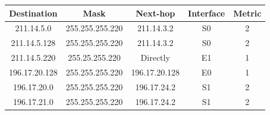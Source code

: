 \documentclass[11pt]{article}
\begin{document}
    \begin{table}[H]
        \centering
        \begin{tabular}{|c|c|c|c|c|}
            \hline
            \textbf{Destination} & \textbf{Mask} & \textbf{Next-hop} & \textbf{Interface} & \textbf{Metric} \\
            \hline
            \hline
            211.14.5.0 & 255.255.255.220 & 211.14.3.2 & S0 &  2 \\
            \hline
            211.14.5.128 & 255.255.255.220 & 211.14.3.2 & S0 & 2 \\
            \hline
            211.14.5.220 & 255.25.255.220 & Directly & E1 & 1 \\
            \hline
            196.17.20.128 & 255.255.255.220 & 196.17.20.128 & E0 & 1 \\
            \hline
            196.17.20.0 & 255.255.255.220 & 196.17.24.2 & S1 & 2 \\
            \hline
            196.17.21.0 & 255.255.255.220 & 196.17.24.2 & S1 & 2 \\
            \hline
        \end{tabular}\label{tab:table-8}
    \end{table}
\end{document}
